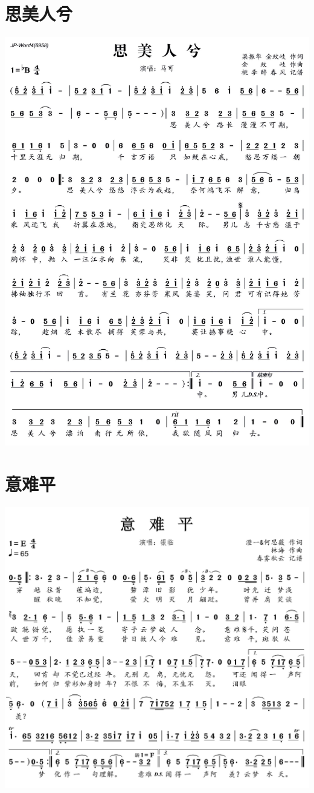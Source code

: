 \documentclass[cn,pad,chinese,chinesefont=nofont]{elegantbook}
\begin{document}
\section{思美人兮}
    \includegraphics[width=\textwidth]{dongxiao/20200402-思美人.jpg}
\section{意难平}
    \includegraphics[width=\textwidth]{dongxiao/20200402-意难平} 
\end{document}
